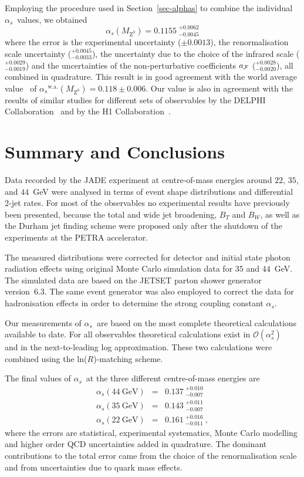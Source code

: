 \documentclass[12pt,a4paper,twoside]{article}
\newcommand{\as}     {\ensuremath{\alpha_s}}
\newcommand{\oaa}    {\ensuremath{\mathcal{O}(\alpha_s^2)}}
\newcommand{\mz}     {\ensuremath{M_{\mathrm{Z^0}}}}
\begin{document}
Employing the procedure used in Section~\ref{sec-alphas} to combine the 
individual \as\ values, we obtained
\begin{displaymath}
   \as(\mz) = 0.1155\ ^{+0.0062}_{-0.0045}
\end{displaymath}
where the error is the experimental uncertainty ($\pm 0.0013$), the
renormalisation scale uncertainty ($^{+0.0045}_{-0.0033}$),
the uncertainty due to the choice of the infrared scale 
($^{+0.0029}_{-0.0019}$) and the uncertainties of the 
non-perturbative coefficients $a_{\cal F}$ ($^{+0.0028}_{-0.0020}$), all
combined in quadrature. This result is in good agreement with the
world average value~\cite{bib-world-alphas-sb} of 
$\as^{\mathrm{w.a.}}(\mz)=0.118\pm 0.006$.
Our value is also in agreement with the results of similar studies 
for different sets of observables by
the DELPHI Collaboration~\cite{bib-DELPHI-powcor} and by the
H1 Collaboration~\cite{bib-H1-powcor}.

\section{Summary and Conclusions }
\label{sec-conclusions}
Data recorded by the JADE experiment at centre-of-mass
energies around $22$, $35$, and $44$~GeV were analysed in terms
of event shape distributions and differential 2-jet rates.
For most of the observables 
no experimental results have previously been presented, 
because the total and wide jet broadening, $B_T$ and $B_W$, as
well as the Durham jet finding scheme were proposed only 
after the shutdown of the experiments at the PETRA accelerator.

The measured distributions were corrected for detector 
and initial state photon radiation effects using original 
Monte Carlo simulation data 
for $35$ and $44$~GeV. 
The simulated data are based
on the JETSET parton shower generator version~6.3. 
The same event 
generator was also employed to correct the data for hadronisation 
effects in order to determine the strong coupling constant \as.

Our measurements of \as\ are based on the most complete theoretical 
calculations available to date. For all observables 
theoretical calculations exist in \oaa\ %
and in the next-to-leading log approximation.
These two calculations were combined using the ln($R$)-matching scheme.

The final values of \as\ 
at the three different centre-of-mass energies are
\begin{eqnarray*}
\as(44\ {\mathrm{GeV}}) & = & 0.137 
                         \ ^{+0.010}
                           _{-0.007} \\
\as(35\ {\mathrm{GeV}}) & = & 0.143 
                         \ ^{+0.011}
                           _{-0.007} \\
\as(22\ {\mathrm{GeV}}) & = & 0.161 
                         \ ^{+0.016}
                           _{-0.011}\ ,
\end{eqnarray*}
where the errors are statistical, experimental systematics, Monte Carlo 
modelling and higher order QCD uncertainties added in quadrature. The 
dominant contributions to the total error came from the choice of the
renormalisation scale and from uncertainties due to quark mass
effects.
\end{document}
